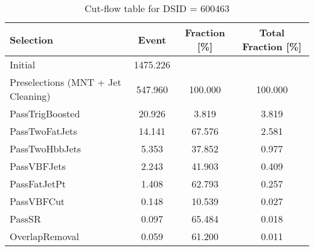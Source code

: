 \begin{table}[ht]
    \centering
    \begin{tabular}{lccc}
        \hline  \hline
        Selection                          & Event    & Fraction [\%] & Total Fraction [\%] \\
        \hline  \hline
        Initial                            & 1475.226 &               &                     \\
        Preselections (MNT + Jet Cleaning) & 547.960  & 100.000       & 100.000             \\
        PassTrigBoosted                    & 20.926   & 3.819         & 3.819               \\
        PassTwoFatJets                     & 14.141   & 67.576        & 2.581               \\
        PassTwoHbbJets                     & 5.353    & 37.852        & 0.977               \\
        PassVBFJets                        & 2.243    & 41.903        & 0.409               \\
        PassFatJetPt                       & 1.408    & 62.793        & 0.257               \\
        PassVBFCut                         & 0.148    & 10.539        & 0.027               \\
        PassSR                             & 0.097    & 65.484        & 0.018               \\
        OverlapRemoval                     & 0.059    & 61.200        & 0.011               \\
        \hline  \hline
    \end{tabular}
    \caption{Cut-flow table for DSID = 600463}
    \label{cutflow_dsid600463}
\end{table}
